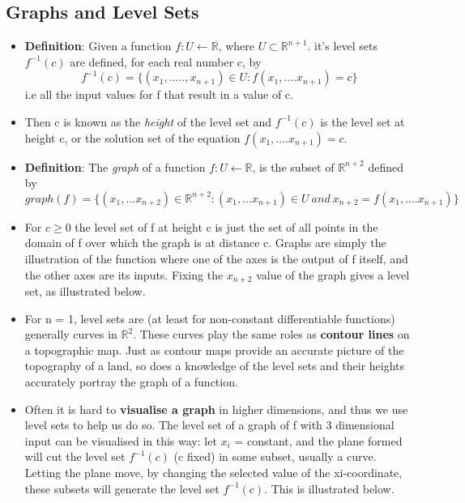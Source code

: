 \documentclass[12pt]{report}
\begin{document}
\subsection{Graphs and Level Sets}

\begin{itemize}
    \item[] \textbf{Definition}: Given a function $f: U \longleftarrow \mathbb{R}$, where $U \subset \mathbb{R}^{n+1}$. it's level sets $f^{-1}(c)$ are defined, for each real number c, by $$f^{-1}(c) = \{ (x_1, ....., x_{n+1}) \in U: f(x_1,....x_{n+1}) = c \}$$ i.e all the input values for f that result in a value of c.
    \item[] Then c is known as the \textit{height} of the level set and $f^{-1}(c)$ is the level set at height c, or the solution set of the equation $f(x_1,....x_{n+1}) = c$.
    \item[] \textbf{Definition}: The \textit{graph} of a function $f: U \longleftarrow \mathbb{R}$, is the subset of $\mathbb{R}^{n+2}$ defined by $$graph(f) = \{ (x_1,...x_{n+2}) \in \mathbb{R}^{n+2}: (x_1,...x_{n+1}) \in U \ and \ x_{n+2} = f(x_1,....x_{n+1}) \}$$
    \item[] For $c \geq 0$ the level set of f at height c is just the set of all points in the domain of f over which the graph is at distance c. Graphs are simply the illustration of the function where one of the axes is the output of f itself, and the other axes are its inputs. Fixing the $x_{n+2}$ value of the graph gives a level set, as illustrated below.
    \item[] For n = 1, level sets are (at least for non-constant differentiable functions) generally curves in $\mathbb{R}^2$. These curves play the same roles as \textbf{contour lines} on a topographic map. Just as contour maps provide an accurate picture of the topography of a land, so does a knowledge of the level sets and their heights accurately portray the graph of a function.
    \item[] Often it is hard to \textbf{visualise a graph} in higher dimensions, and thus we use level sets to help us do so. The level set of a graph of f with 3 dimensional input can be visualised in this way: let $x_i$ = constant, and the plane formed will cut the level set $f^{-1}(c)$ (c fixed) in some subset, usually a curve. Letting the plane move, by changing the selected value of the xi-coordinate, these subsets will generate the level set $f^{-1}(c)$. This is illustrated below.
\end{itemize}
\end{document}
